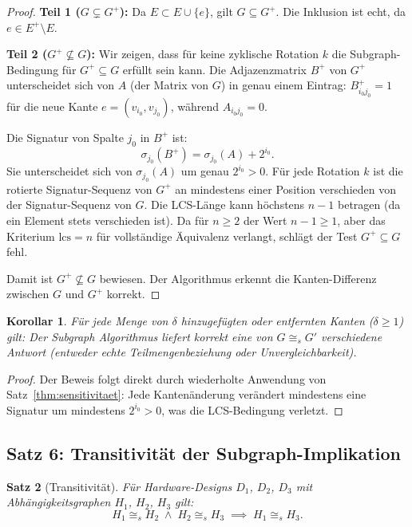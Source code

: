 ﻿\documentclass[12pt,a4paper]{report}
\newtheorem{theorem}{Satz}[section]
\newtheorem{korollar}[theorem]{Korollar}
\begin{document}
\begin{proof}
\textbf{Teil 1 ($G \subsetneq G^+$):} Da $E \subset E \cup \{e\}$, gilt $G \subseteq G^+$. Die Inklusion ist echt, da $e \in E^+ \setminus E$.

\textbf{Teil 2 ($G^+ \not\subseteq G$):} Wir zeigen, dass für keine zyklische Rotation $k$ die Subgraph-Bedingung für $G^+ \subseteq G$ erfüllt sein kann. Die Adjazenzmatrix $B^+$ von $G^+$ unterscheidet sich von $A$ (der Matrix von $G$) in genau einem Eintrag: $B^+_{i_0 j_0} = 1$ für die neue Kante $e = (v_{i_0}, v_{j_0})$, während $A_{i_0 j_0} = 0$.

Die Signatur von Spalte $j_0$ in $B^+$ ist:
\[
\sigma_{j_0}(B^+) = \sigma_{j_0}(A) + 2^{i_0}.
\]
Sie unterscheidet sich von $\sigma_{j_0}(A)$ um genau $2^{i_0} > 0$. Für jede Rotation $k$ ist die rotierte Signatur-Sequenz von $G^+$ an mindestens einer Position verschieden von der Signatur-Sequenz von $G$. Die LCS-Länge kann höchstens $n-1$ betragen (da ein Element stets verschieden ist). Da für $n \geq 2$ der Wert $n-1 \geq 1$, aber das Kriterium $\mathrm{lcs} = n$ für vollständige Äquivalenz verlangt, schlägt der Test $G^+ \subseteq G$ fehl.

Damit ist $G^+ \not\subseteq G$ bewiesen. Der Algorithmus erkennt die Kanten-Differenz zwischen $G$ und $G^+$ korrekt.
\end{proof}

\begin{korollar}
\label{kor:sensitivitaet}
Für jede Menge von $\delta$ hinzugefügten oder entfernten Kanten ($\delta \geq 1$) gilt: Der Subgraph Algorithmus liefert korrekt eine von $G \cong_s G'$ verschiedene Antwort (entweder echte Teilmengenbeziehung oder Unvergleichbarkeit).
\end{korollar}

\begin{proof}
Der Beweis folgt direkt durch wiederholte Anwendung von Satz~\ref{thm:sensitivitaet}: Jede Kantenänderung verändert mindestens eine Signatur um mindestens $2^{i_0} > 0$, was die LCS-Bedingung verletzt.
\end{proof}

\subsection{Satz 6: Transitivität der Subgraph-Implikation}

\begin{theorem}[Transitivität]
\label{thm:transitivitaet}
Für Hardware-Designs $D_1$, $D_2$, $D_3$ mit Abhängigkeitsgraphen $H_1$, $H_2$, $H_3$ gilt:
\[
H_1 \cong_s H_2 \;\land\; H_2 \cong_s H_3 \;\implies\; H_1 \cong_s H_3.
\]
\end{theorem}
\end{document}
